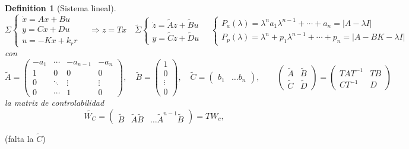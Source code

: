 \documentclass[leqno]{article}
\newtheorem*{definition}{Definition}
\begin{document}
\begin{definition}[Sistema lineal]
\[
\Sigma  \begin{cases}
  \dot{x}=Ax + Bu \\ 
  y = Cx + Du\\
  u = -Kx+k_rr
\end{cases}
\quad \Rightarrow z=Tx \quad 
\tilde{\Sigma }  \begin{cases}
  \dot{z} = \tilde{A}z + \tilde{B}u \\
  y = \tilde{C} z + \tilde{D}u
\end{cases}
\quad \begin{cases}
 P_a(\lambda) = \lambda^n a_1 \lambda^{n-1} + \cdots + a_n = |A-\lambda I|\\
 P_{p}(\lambda) = \lambda^n + p_1\lambda^{n-1} + \cdots +  p_n = |A-BK-\lambda I|
\end{cases}
\] 
con 
\[
  \tilde{A} = \begin{pmatrix} -a_1 & \cdots & -a_{n-1} & -a_n \\ 1 & 0 & 0 & 0 \\ 0 & \ddots & \vdots & \vdots \\ 0 & \cdots & 1 & 0  \end{pmatrix}, \quad \tilde{B} = \begin{pmatrix} 1\\ 0 \\ \vdots \\0 \end{pmatrix}, \quad \tilde{C} = \begin{pmatrix} b_1 & \ldots b_n \end{pmatrix}, \quad
  \quad  \begin{pmatrix} \tilde{A} & \tilde{B} \\ \tilde{C} & \tilde{D} \end{pmatrix}  = \begin{pmatrix} TAT^{-1} & TB \\ CT^{-1} & D \end{pmatrix} 
\] 
la matriz de controlabilidad
\[
  \tilde{W_C} = \begin{pmatrix} \tilde{B} & \tilde{A}\tilde{B} & \ldots \tilde{A}^{n-1}\tilde{B} \end{pmatrix} = TW_c, 
\] 
\end{definition}

(falta la $\tilde{C}$)
\end{document}
